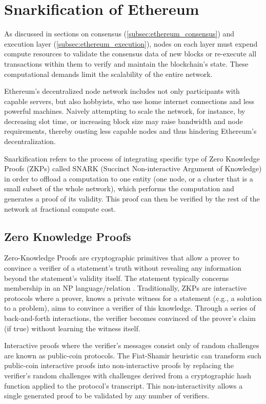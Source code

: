 \section{Snarkification of Ethereum}\label{sec:snarkification}

As discussed in sections on consensus (\ref{subsec:ethereum_consensus}) and
execution layer (\ref{subsec:ethereum_execution}), nodes on each layer must expend
compute resources to validate the consensus data of new blocks or re-execute all
transactions within them to verify and maintain the blockchain's state.
These computational demands limit the scalability of the entire network.

Ethereum's decentralized node network includes not only participants with
capable servers, but also hobbyists, who use home internet connections and
less powerful machines. Naively attempting to scale the network, for instance,
by decreasing slot time, or increasing block size may raise bandwidth and node
requirements, thereby ousting less capable nodes and thus hindering Ethereum's
decentralization.

Snarkification refers to the process of integrating specific type of Zero
Knowledge Proofs (ZKPs) called SNARK (Succinct Non-interactive Argument of
Knowledge) in order to offload a computation to one entity (one node, or a
cluster that is a small subset of the whole network), which performs the
computation and generates a proof of its validity. This proof can then be
verified by the rest of the network at fractional compute cost.

\subsection{Zero Knowledge Proofs}

Zero-Knowledge Proofs are cryptographic primitives that allow a prover
to convince a verifier of a statement's truth without revealing any
information beyond the statement's validity itself. The statement typically
concerns membership in an NP language/relation \cite{GoldreichNPProofs}.
Traditionally, ZKPs are interactive protocols where a prover, knows a
private witness for a statement (e.g., a solution to a problem), aims to
convince a verifier of this knowledge. Through a series of back-and-forth
interactions, the verifier becomes convinced of the prover's claim (if true)
without learning the witness itself.

Interactive proofs where the verifier's messages consist only of random
challenges are known as public-coin protocols. The Fiat-Shamir heuristic \cite{FiatShamir}
can transform such public-coin interactive proofs into non-interactive
proofs by replacing the verifier's random challenges with challenges derived
from a cryptographic hash function applied to the protocol's transcript. This
non-interactivity allows a single generated proof to be validated by any
number of verifiers.

